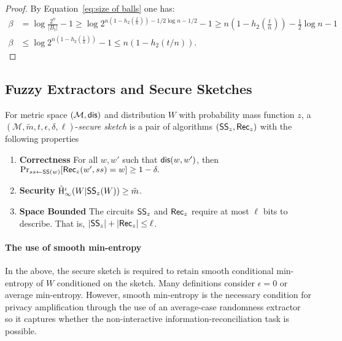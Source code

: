 \begin{proof}
By Equation~\ref{eq:size of balls} one has: 
\begin{align*}
\beta & = \log{\frac{2^n}{|B_t|} -1} \ge \log{2^{n\left(1-h_2\left(\frac{t}{n}\right)\right) - 1/2 \log{n}-1/2} -1} \ge n\left(1-h_2\left(\frac{t}{n}\right)\right) - \frac{1}{2}\log{n}-1\\
\beta&\le \log{2^{n\left(1-h_2\left(\frac{t}{n}\right)\right)} -1} \le n(1-h_2(t/n)).
\end{align*}
\end{proof}


    \subsection{Fuzzy Extractors and Secure Sketches}
\begin{definition}
For metric space $(\mathcal{M}, \mathsf{dis})$ and distribution $W$ with probability mass function $z$, a $(\mathcal{M}, \tilde{m}, t, \epsilon, \delta, \ell)$-\emph{secure sketch} is a pair of algorithms $({\mathsf{SS}}_z, {\mathsf{Rec}}_z)$ with the following properties 
\begin{enumerate} 
\itemsep0em
\item \textbf{Correctness} For all $w, w'$ such that $\mathsf{dis}(w, w')$, then $\Pr_{ss \leftarrow {\ensuremath{\mathsf{SS}}}(w)}[{\mathsf{Rec}}_z(w', ss) = w]\ge 1-\delta.$
\item \textbf{Security}  $\tilde{\mathrm{H}}_\infty^\epsilon(W | {\mathsf{SS}}_z(W)) \ge \tilde{m}$.
\item \textbf{Space Bounded} The circuits ${\mathsf{SS}}_z$ and ${\mathsf{Rec}}_z$ require at most $\ell$ bits to describe.  That is, $|{\mathsf{SS}}_z| +|{\mathsf{Rec}}_z|\le \ell$.
\end{enumerate}
\end{definition}

\paragraph{The use of smooth min-entropy} In the above, the secure sketch is required to retain smooth conditional min-entropy of $W$ conditioned on the sketch.  Many definitions consider $\epsilon=0$ or average min-entropy.  However, smooth min-entropy is the necessary condition for privacy amplification through the use of an average-case randomness extractor~\cite{renner2005simple} so it captures whether the non-interactive information-reconciliation task is possible. 

